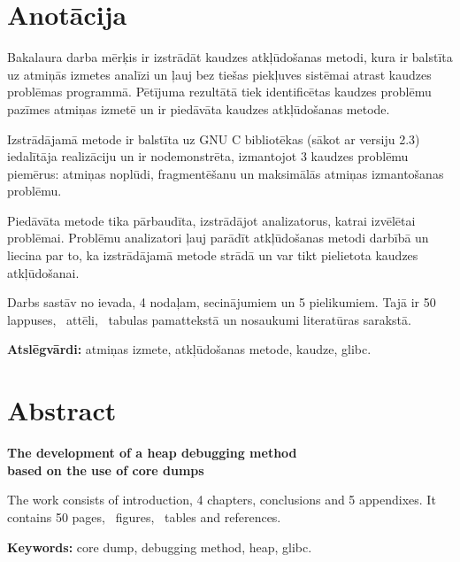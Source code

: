 \chapter*{Anotācija}
\thispagestyle{empty}

Bakalaura darba mērķis ir izstrādāt kaudzes atkļūdošanas metodi, kura ir balstīta uz atmiņās izmetes analīzi un ļauj bez tiešas piekļuves sistēmai atrast kaudzes problēmas programmā.
Pētījuma rezultātā tiek identificētas kaudzes problēmu pazīmes atmiņas izmetē un ir piedāvāta kaudzes atkļūdošanas metode.

Izstrādājamā metode ir balstīta uz GNU C bibliotēkas (sākot ar versiju 2.3) iedalītāja realizāciju un ir nodemonstrēta, izmantojot 3 kaudzes problēmu piemērus: atmiņas noplūdi, fragmentēšanu un maksimālās atmiņas izmantošanas problēmu.

Piedāvāta metode tika pārbaudīta, izstrādājot analizatorus, katrai izvēlētai problēmai.
Problēmu analizatori ļauj parādīt atkļūdošanas metodi darbībā un liecina par to, ka izstrādājamā metode strādā un var tikt pielietota kaudzes atkļūdošanai.



Darbs sastāv no ievada, 4 nodaļam, secinājumiem un 5 pielikumiem. Tajā ir 50 lappuses, \totfig\ attēli, \tottab\ tabulas pamattekstā un  nosaukumi literatūras sarakstā.

\textbf{Atslēgvārdi:} atmiņas izmete, atkļūdošanas metode, kaudze, glibc.

\newpage

\chapter*{Abstract}
\begin{center}
\linespread{1.2}
\vspace{-0.3cm}
\large \textbf {The development of a heap debugging method \protect\\  based on the use of core dumps}
\end{center}

\thispagestyle{empty}
	The work consists of introduction, 4 chapters, conclusions and 5 appendixes. It contains 50 pages, \totfig\ figures, \tottab\ tables and  references.

\textbf{Keywords:} core dump, debugging method, heap, glibc.


\newpage 






